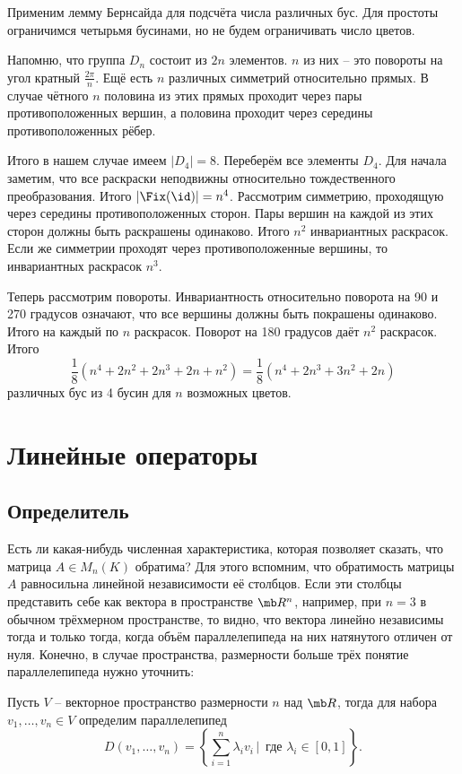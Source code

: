 Применим лемму Бернсайда для подсчёта числа различных бус. Для простоты ограничимся четырьмя бусинами, но не будем ограничивать число цветов. 

Напомню, что группа $D_n$ состоит из $2n$ элементов. $n$ из них -- это повороты на угол кратный $\frac{2\pi}{n}$. Ещё есть $n$ различных симметрий относительно прямых. В случае чётного $n$ половина из этих прямых проходит  через пары противоположенных вершин, а половина проходит через середины противоположенных рёбер. 

Итого в нашем случае имеем $|D_4|=8$. Переберём все элементы $D_4$. Для начала заметим, что все раскраски неподвижны относительно тождественного преобразования. Итого $|\Fix(\id)|=n^4$. Рассмотрим симметрию, проходящую через середины противоположенных сторон. Пары вершин на каждой из этих сторон должны быть раскрашены одинаково. Итого $n^2$ инвариантных раскрасок. Если же симметрии проходят через противоположенные вершины, то инвариантных раскрасок $n^3$. 

Теперь рассмотрим повороты. Инвариантность относительно поворота на 90  и 270 градусов означают, что все вершины должны быть покрашены одинаково. Итого на каждый по $n$ раскрасок. Поворот на 180 градусов даёт $n^2$ раскрасок. Итого
$$\frac{1}{8}(n^4+2n^2+2n^3+2n+n^2)=\frac{1}{8}(n^4+2n^3+3n^2+2n)$$
различных бус из 4 бусин для $n$ возможных цветов.


\chapter{Линейные операторы}



\section{Определитель}

Есть ли какая-нибудь численная характеристика, которая позволяет сказать, что матрица $A\in M_n(K)$ обратима? Для этого вспомним, что обратимость матрицы $A$ равносильна линейной независимости её столбцов. Если эти столбцы представить себе как вектора в пространстве $\mb R^n$, например, при $n=3$ в обычном трёхмерном пространстве, то видно, что вектора линейно независимы тогда и только тогда, когда объём параллелепипеда на них натянутого отличен от нуля. Конечно, в случае пространства, размерности больше трёх понятие параллелепипеда нужно уточнить:

\dfn Пусть $V$ -- векторное пространство размерности $n$ над $\mb R$, тогда для набора  $v_1,\dots,v_n \in V$ определим параллелепипед
$$D(v_1,\dots,v_n)=\left\{\sum_{i=1}^n \lambda_i v_i\,|\, \text{ где } \lambda_i\in [0,1]\right\}.$$
\edfn


